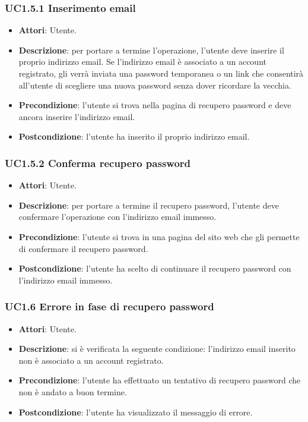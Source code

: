 \subsubsection{UC1.5.1 Inserimento email}
\begin{itemize}
\item \textbf{Attori}: Utente.
\item \textbf{Descrizione}: per portare a termine l'operazione, l'utente deve inserire il proprio indirizzo email. Se l'indirizzo email è associato a un account registrato, gli verrà inviata una password temporanea o un link che consentirà all'utente di scegliere una nuova password senza dover ricordare la vecchia.
\item \textbf{Precondizione}: l'utente si trova nella pagina di recupero password e deve ancora inserire l'indirizzo email.
\item \textbf{Postcondizione}: l'utente ha inserito il proprio indirizzo email.
\end{itemize}
\subsubsection{UC1.5.2 Conferma recupero password}
\begin{itemize}
\item \textbf{Attori}: Utente.
\item \textbf{Descrizione}: per portare a termine il recupero password, l'utente deve confermare l'operazione con l'indirizzo email immesso.
\item \textbf{Precondizione}: l'utente si trova in una pagina del sito web che gli permette di confermare il recupero password.
\item \textbf{Postcondizione}: l'utente ha scelto di continuare il recupero password con l'indirizzo email immesso.
\end{itemize}
\subsubsection{UC1.6 Errore in fase di recupero password}
\begin{itemize}
\item \textbf{Attori}: Utente.
\item \textbf{Descrizione}: si è verificata la seguente condizione: l'indirizzo email inserito non è associato a un account registrato.
\item \textbf{Precondizione}: l'utente ha effettuato un tentativo di recupero password che non è andato a buon termine.
\item \textbf{Postcondizione}: l'utente ha visualizzato il messaggio di errore.
\end{itemize}
